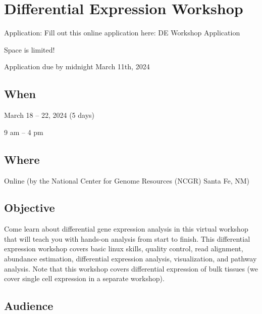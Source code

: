 \documentclass[
]{book}
\begin{document}
\hypertarget{differential-expression-workshop}{%
\chapter*{Differential Expression Workshop}\label{differential-expression-workshop}}

Application: Fill out this online application here: DE Workshop Application

Space is limited!

Application due by midnight March 11th, 2024

\hypertarget{when-4}{%
\section*{When}\label{when-4}}

March 18 -- 22, 2024 (5 days)

9 am -- 4 pm

\hypertarget{where-4}{%
\section*{Where}\label{where-4}}

Online (by the National Center for Genome Resources (NCGR) Santa Fe, NM)

\hypertarget{objective-4}{%
\section*{Objective}\label{objective-4}}

Come learn about differential gene expression analysis in this virtual workshop that will teach you with hands-on analysis from start to finish. This differential expression workshop covers basic linux skills, quality control, read alignment, abundance estimation, differential expression analysis, visualization, and pathway analysis. Note that this workshop covers differential expression of bulk tissues (we cover single cell expression in a separate workshop).

\hypertarget{audience-4}{%
\section*{Audience}\label{audience-4}}
\end{document}
